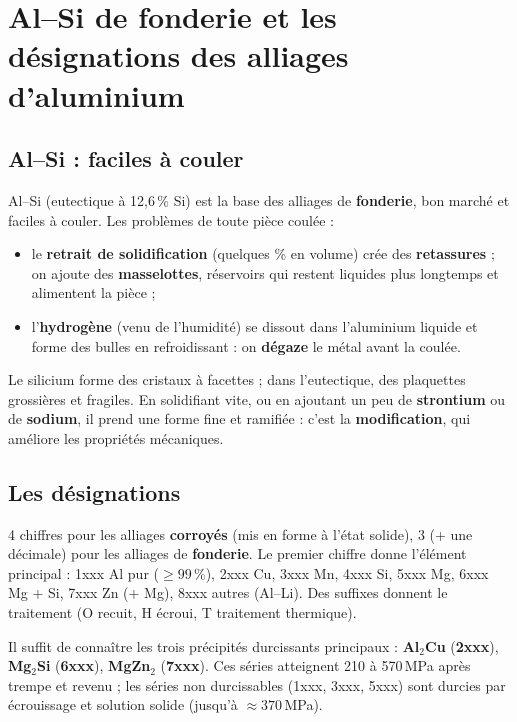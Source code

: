 \section{Al--Si de fonderie et les désignations des alliages d'aluminium}

\subsection*{Al--Si : faciles à couler}

Al--Si (eutectique à 12,6\,\% Si) est la base des alliages de \textbf{fonderie}, bon marché et
faciles à couler. Les problèmes de toute pièce coulée :
\begin{itemize}
  \item le \textbf{retrait de solidification} (quelques \% en volume) crée des
        \textbf{retassures} ; on ajoute des \textbf{masselottes}, réservoirs qui restent liquides
        plus longtemps et alimentent la pièce ;
  \item l'\textbf{hydrogène} (venu de l'humidité) se dissout dans l'aluminium liquide et forme
        des bulles en refroidissant : on \textbf{dégaze} le métal avant la coulée.
\end{itemize}
Le silicium forme des cristaux à facettes ; dans l'eutectique, des plaquettes grossières et
fragiles. En solidifiant vite, ou en ajoutant un peu de \textbf{strontium} ou de
\textbf{sodium}, il prend une forme fine et ramifiée : c'est la \textbf{modification}, qui
améliore les propriétés mécaniques.

\subsection*{Les désignations}


\begin{defnbox}[title={Séries des alliages d'aluminium}]
4 chiffres pour les alliages \textbf{corroyés} (mis en forme à l'état solide), 3 (+ une
décimale) pour les alliages de \textbf{fonderie}. Le premier chiffre donne l'élément principal :
1xxx Al pur ($\ge 99\,\%$), 2xxx Cu, 3xxx Mn, 4xxx Si, 5xxx Mg, 6xxx Mg + Si, 7xxx Zn (+ Mg),
8xxx autres (Al--Li). Des suffixes donnent le traitement (O recuit, H écroui, T traitement
thermique).
\end{defnbox}

\begin{propbox}[title={Retenir les séries durcissables par précipitation}]
Il suffit de connaître les trois précipités durcissants principaux : \textbf{Al$_2$Cu}
(\textbf{2xxx}), \textbf{Mg$_2$Si} (\textbf{6xxx}), \textbf{MgZn$_2$} (\textbf{7xxx}). Ces séries
atteignent 210 à 570\,MPa après trempe et revenu ; les séries non durcissables (1xxx, 3xxx,
5xxx) sont durcies par écrouissage et solution solide (jusqu'à $\approx 370$\,MPa).
\end{propbox}

